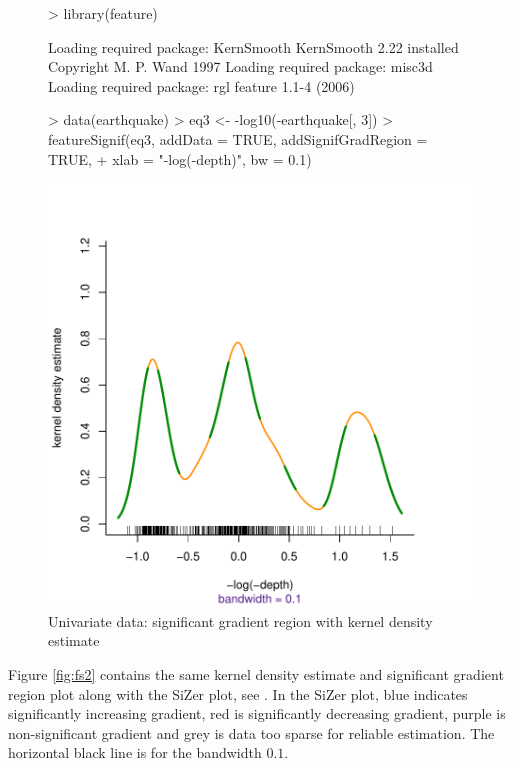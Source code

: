 \documentclass[a4paper]{article}
\begin{document}
\begin{figure}
\begin{center}
\begin{Schunk}
\begin{Sinput}
> library(feature)
\end{Sinput}
\begin{Soutput}
Loading required package: KernSmooth
KernSmooth 2.22 installed
Copyright M. P. Wand 1997
Loading required package: misc3d
Loading required package: rgl
feature 1.1-4 (2006)
\end{Soutput}
\begin{Sinput}
> data(earthquake)
> eq3 <- -log10(-earthquake[, 3])
> featureSignif(eq3, addData = TRUE, addSignifGradRegion = TRUE, 
+     xlab = "-log(-depth)", bw = 0.1)
\end{Sinput}
\end{Schunk}
\includegraphics{feature-001}
\caption{Univariate data: significant gradient region with kernel density estimate}
\label{fig:fs1}
\end{center}
\end{figure}

Figure \ref{fig:fs2} contains the same kernel density estimate and 
significant gradient region plot along with the SiZer plot, see .
In the SiZer plot, blue indicates significantly increasing gradient,
red is significantly decreasing gradient, purple is non-significant gradient
and grey is data too sparse for reliable estimation. The horizontal black line
is for the bandwidth $0.1$.
\end{document}
